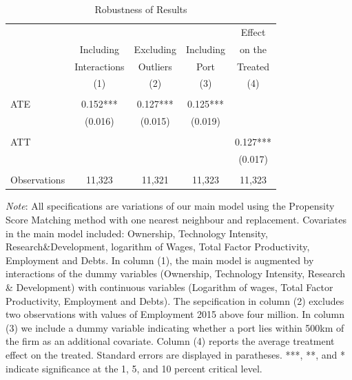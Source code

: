 \documentclass[a4paper,11pt]{scrartcl}
\begin{document}
 
\begin{table}[h]
  \centering
   \caption{Robustness of Results}
   \label{tab:robust}
\begin{threeparttable}
 
\begin{tabular}{lcccc} 
	\hline 
	\hline
 		& & & & Effect \\
 		& Including & Excluding & Including & on the\\
 		& Interactions & Outliers 
 		& Port & Treated \\
 		& (1) & (2) & (3) & (4) \\ 
 	\hline
 		&  &  &  &  \\
ATE 	& 0.152*** & 0.127*** & 0.125*** &  \\
 		& (0.016) & (0.015) & (0.019) &  \\
 		&  &  &  &  \\
ATT 	&  &  &  & 0.127*** \\
 		&  &  &  & (0.017) \\
 		&  &  &  &  \\
Observations & 11,323 & 11,321 & 11,323 & 11,323 \\ 
	\hline
	\hline
\end{tabular}

\begin{tablenotes}[flushleft]
     \footnotesize  
    
\item \textit{Note}: All specifications are variations of our main model using the Propensity Score Matching method with one nearest neighbour and replacement. Covariates in the main model included: Ownership, Technology Intensity, Research\&Development, logarithm of Wages, Total Factor Productivity, Employment and Debts. In column (1), the main model is augmented by interactions of the dummy variables (Ownership, Technology Intensity, Research \& Development) with continuous variables (Logarithm of wages, Total Factor Productivity, Employment and Debts).  The sepcification in column (2) excludes two observations with values of Employment 2015 above four million. In column (3) we include a dummy variable indicating whether a port lies within 500km of the firm as an additional covariate. Column (4) reports the average treatment effect on the treated. Standard errors are displayed in paratheses. ***, **, and * indicate significance at the 1, 5, and 10 percent critical level. 

\end{tablenotes}

\end{threeparttable}
\end{table}
\end{document}
